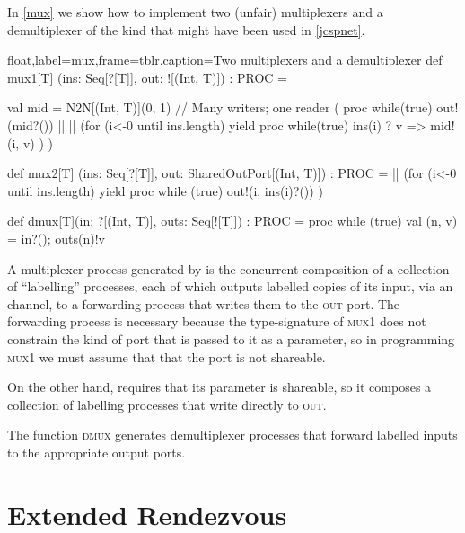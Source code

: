\documentclass[12pt]{IOS-Book-Article-CPA-2017}
\begin{document}
In \Listing \ref{mux}  we show how to implement two (unfair) 
multiplexers and a demultiplexer of the kind that might have
been used in \Listing \ref{jcspnet}.

\begin{code+}[...]{float,label=mux,frame=tblr,caption={Two multiplexers and a demultiplexer}}
  def mux1[T] (ins: Seq[?[T]], out: ![(Int, T)]) : PROC =
  { val mid = N2N[(Int, T)](0, 1) // Many writers; one reader
    (  proc { while(true) { out!(mid?()) } } ||
    || (for (i<-0 until ins.length) yield 
            proc { while(true) ins(i) ? { v => mid!(i, v)} })
    )
    
  }   
   
  def mux2[T] (ins: Seq[?[T]], out: SharedOutPort[(Int, T)]) : PROC =
      || (for (i<-0 until ins.length) yield 
              proc { while (true) {out!(i, ins(i)?())} })   

  def dmux[T](in:  ?[(Int, T)], outs: Seq[![T]]) : PROC = proc { 
    while (true) { val (n, v) = in?(); outs(n)!v  } 
  }
\end{code+}

A multiplexer process generated by  is the concurrent composition 
of a collection of ``labelling'' processes, each of which outputs labelled copies of its
input, via an  channel, to a forwarding process that
writes them to the \textsc{out} port. The forwarding process is necessary
because the type-signature of \textsc{mux1} does not constrain the
kind of port that is passed to it as a parameter, so in programming \textsc{mux1}
we must assume that that the port is not shareable.

On the other hand,  requires that its  
parameter is shareable, so it composes a collection of labelling processes that
write directly to \textsc{out}.

The function \textsc{dmux} generates demultiplexer processes that forward
labelled inputs to the appropriate output ports.



\section{Extended Rendezvous} 
\end{document}
